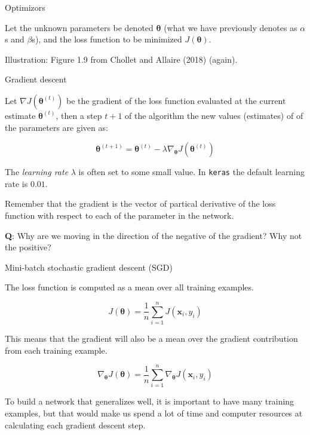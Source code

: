 \documentclass[10pt,ignorenonframetext,]{beamer}
\begin{document}
\begin{frame}

\begin{block}{Optimizors}

Let the unknown parameters be denoted \({\boldsymbol \theta}\) (what we
have previously denotes as \(\alpha\)s and \(\beta\)s), and the loss
function to be minimized \(J({\boldsymbol \theta})\).

Illustration: Figure 1.9 from Chollet and Allaire (2018) (again).

\end{block}

\end{frame}

\begin{frame}[fragile]

\begin{block}{Gradient descent}

Let \(\nabla J({\boldsymbol \theta}^{(t)})\) be the gradient of the loss
function evaluated at the current estimate
\({\boldsymbol \theta}^{(t)}\), then a step \(t+1\) of the algorithm the
new values (estimates) of of the parameters are given as:

\[{\boldsymbol \theta}^{(t+1)}={\boldsymbol \theta}^{(t)} - \lambda \nabla_{\boldsymbol \theta} J({\boldsymbol \theta}^{(t)})\]

The \emph{learning rate} \(\lambda\) is often set to some small value.
In \texttt{keras} the default learning rate is \(0.01\).

Remember that the gradient is the vector of partical derivative of the
loss function with respect to each of the parameter in the network.

\textbf{Q}: Why are we moving in the direction of the negative of the
gradient? Why not the positive?

\end{block}

\end{frame}

\begin{frame}

\begin{block}{Mini-batch stochastic gradient descent (SGD)}

The loss function is computed as a mean over all training examples.

\[J({\boldsymbol \theta})=\frac{1}{n}\sum_{i=1}^n J({\boldsymbol x}_i, y_i)\]

This means that the gradient will also be a mean over the gradient
contribution from each training example.

\[\nabla_{\boldsymbol \theta} J({\boldsymbol \theta})=\frac{1}{n}\sum_{i=1}^n \nabla_{\boldsymbol \theta} J({\boldsymbol x}_i, y_i)\]

To build a network that generalizes well, it is important to have many
training examples, but that would make us spend a lot of time and
computer resources at calculating each gradient descent step.

\end{block}

\end{frame}
\end{document}
